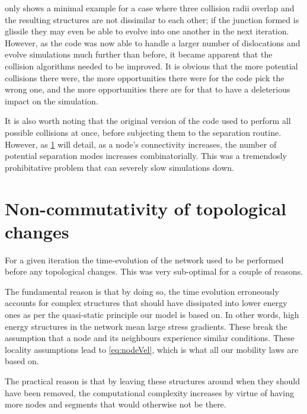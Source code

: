  only shows a minimal example for a case where three collision radii overlap and the resulting structures are not dissimilar to each other; if the junction formed is glissile they may even be able to evolve into one another in the next iteration. However, as the code was now able to handle a larger number of dislocations and evolve simulations much further than before, it became apparent that the collision algorithms needed to be improved. It is obvious that the more potential collisions there were, the more opportunities there were for the code pick the wrong one, and the more opportunities there are for that to have a deleterious impact on the simulation.

It is also worth noting that the original version of the code used to perform all possible collisions at once, before subjecting them to the separation routine. However, as \cref{s:nonCommutativity} will detail, as a node's connectivity increases, the number of potential separation modes increases combinatorially. This was a tremendosly prohibitative problem that can severely slow simulations down.

\section{Non-commutativity of topological changes}\label{s:nonCommutativity}

For a given iteration the time-evolution of the network used to be performed before any topological changes. This was very sub-optimal for a couple of reasons.

The fundamental reason is that by doing so, the time evolution erroneously accounts for complex structures that should have dissipated into lower energy ones as per the quasi-static principle our model is based on. In other words, high energy structures in the network mean large stress gradients. These break the assumption that a node and its neighbours experience similar conditions. These locality assumptions lead to \cref{eq:nodeVel}, which is what all our mobility laws are based on.

The practical reason is that by leaving these structures around when they should have been removed, the computational complexity increases by virtue of having more nodes and segments that would otherwise not be there.


